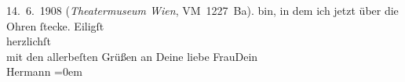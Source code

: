 \begin{ledgroupsized}[t]{13cm}
{{{                     14. 6. 1908 (\emph{Theatermuseum Wien}, VM 1227 Ba).}}}\label{K_L01773_2h} bin, in dem
               ich jetzt über die Ohren ſtecke.\pend
           \pstart
           Eiligſt{\\[\baselineskip]}herzlichſt{\\[\baselineskip]}mit den allerbeſten Grüßen an Deine liebe FrauDein{\\[\baselineskip]}\spacefill\mbox{Hermann}\pend
           \leftskip=0em{}
         
         \endnumbering{}\end{ledgroupsized}  \newcommand{\dateiname}{L01773}\newcommand{\titel}{Hermann Bahr an Arthur Schnitzler, 3. [6.] 1908}\newcommand{\editorInnen}{ Kurt Ifkovits,  Martin Anton Müller}
      